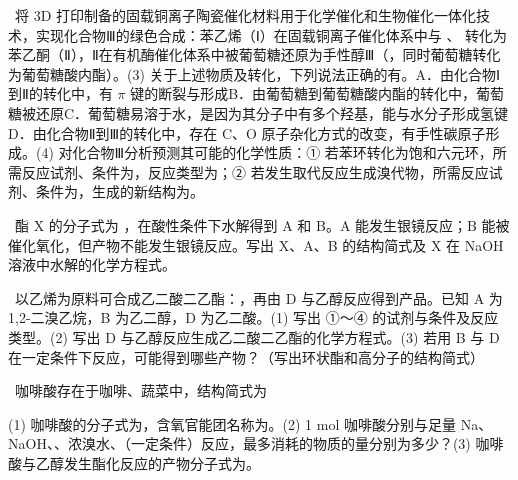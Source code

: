 \begin{xiti}
\item {}\ 将 3D 打印制备的固载铜离子陶瓷催化材料用于化学催化和生物催化一体化技术，实现化合物Ⅲ的绿色合成：苯乙烯（Ⅰ）在固载铜离子催化体系中与 、 转化为苯乙酮（Ⅱ），Ⅱ在有机酶催化体系中被葡萄糖还原为手性醇Ⅲ（，同时葡萄糖转化为葡萄糖酸内酯）。(3) 关于上述物质及转化，下列说法正确的有\tk。A．由化合物Ⅰ到Ⅱ的转化中，有 $\pi$ 键的断裂与形成\quad B．由葡萄糖到葡萄糖酸内酯的转化中，葡萄糖被还原\quad C．葡萄糖易溶于水，是因为其分子中有多个羟基，能与水分子形成氢键\quad D．由化合物Ⅱ到Ⅲ的转化中，存在 C、O 原子杂化方式的改变，有手性碳原子形成。(4) 对化合物Ⅲ分析预测其可能的化学性质：① 若苯环转化为饱和六元环，所需反应试剂、条件为\tk，反应类型为\tk；② 若发生取代反应生成溴代物，所需反应试剂、条件为\tk，生成的新结构为\tk。

\item {}\ 酯 X 的分子式为 ，在酸性条件下水解得到 A 和 B。A 能发生银镜反应；B 能被催化氧化，但产物不能发生银镜反应。写出 X、A、B 的结构简式及 X 在 NaOH 溶液中水解的化学方程式。
\end{xiti}

\begin{xiti}
\item {}\ 以乙烯为原料可合成乙二酸二乙酯：，再由 D 与乙醇反应得到产品。已知 A 为 1,2-二溴乙烷，B 为乙二醇，D 为乙二酸。(1) 写出 ①～④ 的试剂与条件及反应类型。(2) 写出 D 与乙醇反应生成乙二酸二乙酯的化学方程式。(3) 若用 B 与 D 在一定条件下反应，可能得到哪些产物？（写出环状酯和高分子的结构简式）

\item {}\ 咖啡酸存在于咖啡、蔬菜中，结构简式为
\begin{center}\end{center}
(1) 咖啡酸的分子式为\tk，含氧官能团名称为\tk。(2) 1 mol 咖啡酸分别与足量 Na、NaOH、、浓溴水、（一定条件）反应，最多消耗的物质的量分别为多少？(3) 咖啡酸与乙醇发生酯化反应的产物分子式为\tk。
\end{xiti}


